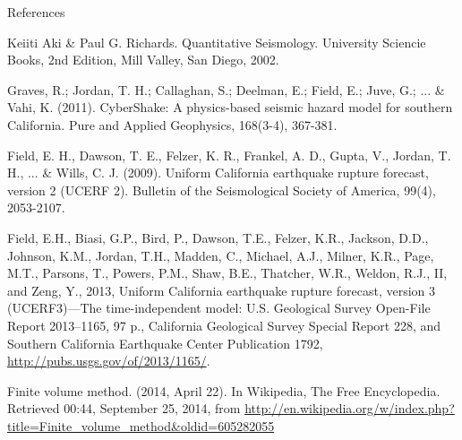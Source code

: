 \documentclass{beamer}
\begin{document}
%
%
\begin{frame}[allowframebreaks]{References}
\def\newblock{}
%
%

\begin{thebibliography}{1}

 Keiiti Aki \& Paul G. Richards. {Q}uantitative {S}eismology. University Sciencie Books, 2nd Edition, Mill Valley, San Diego, 2002.

 Graves, R.; Jordan, T. H.; Callaghan, S.; Deelman, E.; Field, E.; Juve, G.; ... \& Vahi, K. (2011). CyberShake: A physics-based seismic hazard model for southern California. Pure and Applied Geophysics, 168(3-4), 367-381.

 Field, E. H., Dawson, T. E., Felzer, K. R., Frankel, A. D., Gupta, V., Jordan, T. H., ... \& Wills, C. J. (2009). Uniform California earthquake rupture forecast, version 2 (UCERF 2). Bulletin of the Seismological Society of America, 99(4), 2053-2107.

 Field, E.H., Biasi, G.P., Bird, P., Dawson, T.E., Felzer, K.R., Jackson, D.D., Johnson, K.M., Jordan, T.H., Madden, C., Michael, A.J., Milner, K.R., Page, M.T., Parsons, T., Powers, P.M., Shaw, B.E., Thatcher, W.R., Weldon, R.J., II, and Zeng, Y., 2013, Uniform California earthquake rupture forecast, version 3 (UCERF3)—The time-independent model: U.S. Geological Survey Open-File Report 2013–1165, 97 p., California Geological Survey Special Report 228, and Southern California Earthquake Center Publication 1792, \url{http://pubs.usgs.gov/of/2013/1165/}.

 Finite volume method. (2014, April 22). In Wikipedia, The Free Encyclopedia. Retrieved 00:44, September 25, 2014, from \url{http://en.wikipedia.org/w/index.php?title=Finite_volume_method&oldid=605282055}

\end{thebibliography}

\end{frame}
\end{document}
